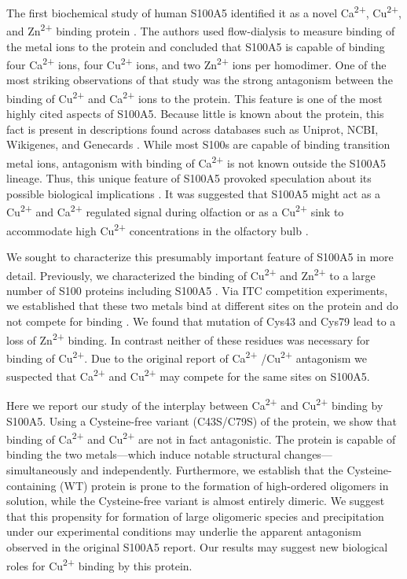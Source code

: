 The first biochemical study of human S100A5 identified it as a novel
Ca\textsuperscript{2+}, Cu\textsuperscript{2+}, and Zn\textsuperscript{2+} 
binding protein \cite{schafer_brain_2000}. The authors used flow-dialysis
to measure binding of the metal ions to the protein and concluded
that S100A5 is capable of binding four Ca\textsuperscript{2+} ions,
four Cu\textsuperscript{2+} ions, and two Zn\textsuperscript{2+} 
ions per homodimer. One of the most striking observations of that
study was the strong antagonism between the binding of Cu\textsuperscript{2+} 
and Ca\textsuperscript{2+} ions to the protein. This feature is one
of the most highly cited aspects of S100A5. Because little is known
about the protein, this fact is present in descriptions found across
databases such as Uniprot, NCBI, Wikigenes, and Genecards \cite{noauthor_wikigenes_nodate,noauthor_s100a5_nodate,noauthor_s100a5_nodate-1}.
While most S100s are capable of binding transition metal ions, antagonism
with binding of Ca\textsuperscript{2+} is not known outside the S100A5
lineage. Thus, this unique feature of S100A5 provoked speculation
about its possible biological implications \cite{schafer_brain_2000,moroz_role_2010}.
It was suggested that S100A5 might act as a Cu\textsuperscript{2+} 
and Ca\textsuperscript{2+} regulated signal during olfaction or as
a Cu\textsuperscript{2+} sink to accommodate high Cu\textsuperscript{2+} 
concentrations in the olfactory bulb \cite{schafer_brain_2000}. 

We sought to characterize this presumably important feature of S100A5
in more detail. Previously, we characterized the binding of Cu\textsuperscript{2+} 
and Zn\textsuperscript{2+} to a large number of S100 proteins including
S100A5 \cite{wheeler_multiple_2016}. Via ITC competition experiments,
we established that these two metals bind at different sites on the
protein and do not compete for binding \cite{wheeler_multiple_2016}.
We found that mutation of Cys43 and Cys79 lead to a loss of Zn\textsuperscript{2+} 
binding. In contrast neither of these residues was necessary for binding
of Cu\textsuperscript{2+}. Due to the original report of Ca\textsuperscript{2+} /Cu\textsuperscript{2+} 
antagonism we suspected that Ca\textsuperscript{2+} and Cu\textsuperscript{2+} 
may compete for the same sites on S100A5. 

Here we report our study of the interplay between Ca\textsuperscript{2+} 
and Cu\textsuperscript{2+} binding by S100A5. Using a Cysteine-free
variant (C43S/C79S) of the protein, we show that binding of Ca\textsuperscript{2+} 
and Cu\textsuperscript{2+} are not in fact antagonistic. The protein
is capable of binding the two metals---which induce notable structural
changes---simultaneously and independently. Furthermore, we establish
that the Cysteine-containing (WT) protein is prone to the formation
of high-ordered oligomers in solution, while the Cysteine-free variant
is almost entirely dimeric. We suggest that this propensity for formation
of large oligomeric species and precipitation under our experimental
conditions may underlie the apparent antagonism observed in the original
S100A5 report. Our results may suggest new biological roles for Cu\textsuperscript{2+} 
binding by this protein.

